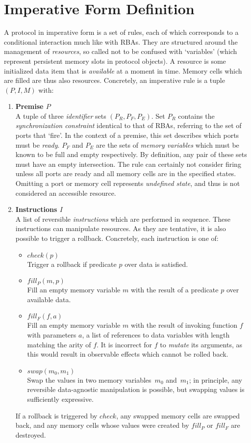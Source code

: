 \section{Imperative Form Definition}
\label{sec:imperative_form_definition}
A protocol in imperative form is a set of rules, each of which corresponds to a conditional interaction much like with RBAs. They are structured around the management of \textit{resources}, so called not to be confused with `variables' (which represent persistent memory slots in protocol objects). A resource is some initialized data item that is \textit{available} at a moment in time. Memory cells which are filled are thus also resources. Concretely, an imperative rule is a tuple $(P, I, M)$ with:
\begin{enumerate}
	\item \textbf{Premise $P$}\\
	A tuple of three \textit{identifier} sets $(P_R, P_F, P_E)$. Set $P_R$ contains the \textit{synchronization constraint} identical to that of RBAs, referring to the set of ports that `fire'. In the context of a premise, this set describes which ports must be \textit{ready}. $P_F$ and $P_E$ are the sets of \textit{memory variables} which must be known to be full and empty respectively. By definition, any pair of these sets must have an empty intersection. The rule can certainly not consider firing unless all ports are ready and all memory cells are in the specified states. Omitting a port or memory cell represents \textit{undefined state}, and thus is not considered an accessible resource.
	
	\item \textbf{Instructions $I$}\\
	A list of reversible \textit{instructions} which are performed in sequence. These instructions can manipulate resources. As they are tentative, it is also possible to trigger a rollback. Concretely, each instruction is one of:
	\begin{itemize}
		\item $check(p)$\\
		Trigger a rollback if predicate $p$ over data is satisfied.
		\item $fill_P(m, p)$\\Fill an empty memory variable $m$ with the result of a predicate $p$ over available data.
		\item $fill_F(f, a)$\\
		Fill an empty memory variable $m$ with the result of invoking function $f$ with parameters $a$, a list of references to data variables with length matching the arity of $f$. It is incorrect for $f$ to \textit{mutate} its arguments, as this would result in observable effects which cannot be rolled back.
		\item $swap(m_0,m_1)$\\
		Swap the values in two memory variables~$m_0$ and~$m_1$; in principle, any reversible data-agnostic manipulation is possible, but swapping values is sufficiently expressive.
	\end{itemize}
	If a rollback is triggered by $check$, any swapped memory cells are swapped back, and any memory cells whose values were created by $fill_P$ or $fill_F$ are destroyed.


\end{enumerate}
